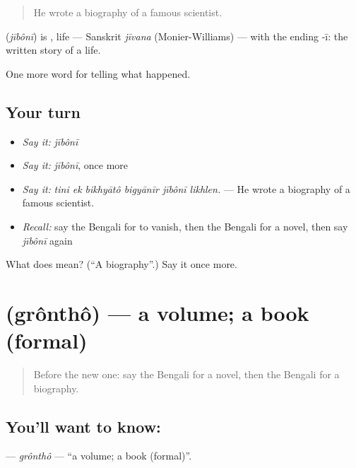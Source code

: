 \begin{quote}
He wrote a biography of a famous scientist.
\end{quote}

\begin{cousinweb}
\textbf{} (\emph{jībônī}) is \textbf{}, life — Sanskrit \emph{jīvana} (Monier-Williams) — with the ending -ī: the written story of a life.
\end{cousinweb}

\begin{grammarlens}[title={What you've built}]
One more word for telling what happened.
\end{grammarlens}

\subsection*{Your turn}
\begin{itemize}
\raggedright
  \item \emph{Say it:} \emph{jībônī}
  \item \emph{Say it:} \emph{jībônī}, once more
  \item \emph{Say it:} \emph{tini ek bikhyātô bigyānīr jībônī likhlen.} — He wrote a biography of a famous scientist.
  \item \emph{Recall:} say the Bengali for to vanish, then the Bengali for a novel, then say \emph{jībônī} again
\end{itemize}

\begin{tcolorbox}[breakable,colback=teal!4,colframe=teal!35!black,title={Before you move on}]
What does  mean? (\textquotedblleft{}A biography\textquotedblright{}.) Say it once more.
\end{tcolorbox}
\section[\texorpdfstring{\bn{গ্রন্থ} (grônthô)}{গ্রন্থ (grônthô)}]{ (grônthô) — a volume; a book (formal)}

\label{lesson:BN-C327-grontho}



\begin{quote}
Before the new one: say the Bengali for a novel, then the Bengali for a biography.
\end{quote}

\subsection*{You'll want to know: }
\textbf{} — \emph{grônthô} — \textquotedblleft{}a volume; a book (formal)\textquotedblright{}.

